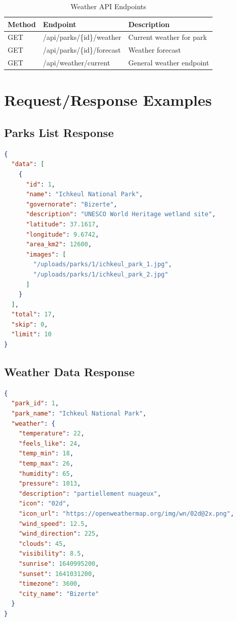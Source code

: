 \documentclass[12pt,a4paper]{report}
\begin{document}
\begin{table}[H]
\centering
\caption{Weather API Endpoints}
\label{tab:weather-endpoints}
\begin{tabular}{@{}lll@{}}
\toprule
Method & Endpoint & Description \\
\midrule
GET & /api/parks/\{id\}/weather & Current weather for park \\
GET & /api/parks/\{id\}/forecast & Weather forecast \\
GET & /api/weather/current & General weather endpoint \\
\bottomrule
\end{tabular}
\end{table}

\section{Request/Response Examples}

\subsection{Parks List Response}

\begin{lstlisting}[language=JSON, caption=Parks List API Response]
{
  "data": [
    {
      "id": 1,
      "name": "Ichkeul National Park",
      "governorate": "Bizerte",
      "description": "UNESCO World Heritage wetland site",
      "latitude": 37.1617,
      "longitude": 9.6742,
      "area_km2": 12600,
      "images": [
        "/uploads/parks/1/ichkeul_park_1.jpg",
        "/uploads/parks/1/ichkeul_park_2.jpg"
      ]
    }
  ],
  "total": 17,
  "skip": 0,
  "limit": 10
}
\end{lstlisting}

\subsection{Weather Data Response}

\begin{lstlisting}[language=JSON, caption=Weather API Response]
{
  "park_id": 1,
  "park_name": "Ichkeul National Park",
  "weather": {
    "temperature": 22,
    "feels_like": 24,
    "temp_min": 18,
    "temp_max": 26,
    "humidity": 65,
    "pressure": 1013,
    "description": "partiellement nuageux",
    "icon": "02d",
    "icon_url": "https://openweathermap.org/img/wn/02d@2x.png",
    "wind_speed": 12.5,
    "wind_direction": 225,
    "clouds": 45,
    "visibility": 8.5,
    "sunrise": 1640995200,
    "sunset": 1641031200,
    "timezone": 3600,
    "city_name": "Bizerte"
  }
}
\end{lstlisting}
\end{document}
